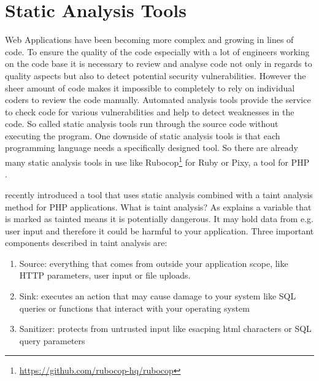 \section{Static Analysis Tools}
Web Applications have been becoming more complex and growing in lines of code. To ensure the quality of the code especially with a lot of engineers working on the code base it is necessary to review and analyse code not only in regards to quality aspects but also to detect potential security vulnerabilities. However the sheer amount of code makes it impossible to completely to rely on individual coders to review the code manually. Automated analysis tools provide the service to check code for various vulnerabilities and help to detect weaknesses in the code. So called static analysis tools run through the source code without executing the program. One downside of static analysis tools is that each programming language needs a specifically designed tool. So there are already many static analysis tools in use like Rubocop\footnote{ \url{https://github.com/rubocop-hq/rubocop}} for Ruby or Pixy, a tool for PHP \autocite[]{Jovanovic2006}.\newline



\textcite[]{Maskur2019} recently introduced a tool that uses static analysis combined with a taint analysis method for PHP applications. What is taint analysis? As \textcite[]{Shannon2018} explains a variable that is marked as tainted means it is potentially dangerous. It may hold data from e.g. user input and therefore it could be harmful to your application. Three important components described in taint analysis are:

\begin{enumerate}
    \item Source: everything that comes from outside your application scope, like HTTP parameters, user input or file uploads.
    \item Sink: executes an action that may cause damage to your system like SQL queries or functions that interact with your operating system
    \item Sanitizer: protects from untrusted input like esacping html characters or SQL query parameters
\end{enumerate}


